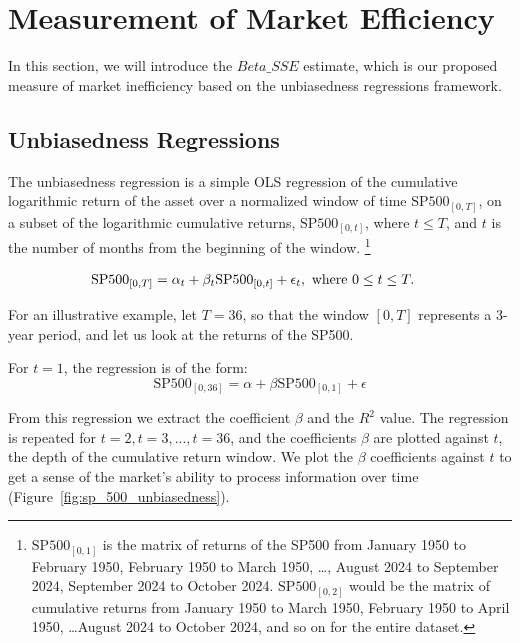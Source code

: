 \section{Measurement of Market Efficiency}
\label{sec:market_efficiency}

In this section, we will introduce the $Beta\_SSE$ estimate, which is our proposed measure of market inefficiency based on the unbiasedness regressions framework.

\subsection{Unbiasedness Regressions}

\noindent The unbiasedness regression is a simple OLS regression of the cumulative logarithmic return of the asset over a normalized window of time $\mathrm{SP500}_{[0, T]}$, on a subset of the
logarithmic cumulative returns, $\mathrm{SP500}_{[0, t]}$, where $t \leq T$, and $t$ is the number of months from the beginning of the window.
 \footnote{$\mathrm{SP500}_{[0, 1]}$ is the matrix of returns of the SP500 from January 1950 to February 1950, February 1950 to March 1950, \dots, August 2024 to September 2024, September 2024 to October 2024.\newline
$\mathrm{SP500}_{[0, 2]}$ would be the matrix of cumulative returns from January 1950 to March 1950, February 1950 to April 1950, \dots August 2024 to October 2024, and so on for the entire dataset.}

\begin{equation}
    \begin{aligned}
        \mathrm{SP500}_{[0, T]} &= \alpha_t + \beta_t \mathrm{SP500}_{[0, t]} + \epsilon_{t}, \hfill \text{   where } 0 \leq t \leq T.
    \end{aligned}
\end{equation}

\noindent For an illustrative example, let $T = 36$, so that the window $[0, T]$ represents a 3-year period, and let us look at the returns of the SP500.

\noindent For $t=1$, the regression is of the form:
\begin{equation}
    \mathrm{SP500}_{[0, 36]} = \alpha + \beta \mathrm{SP500}_{[0, 1]} + \epsilon
\end{equation}

\noindent From this regression we extract the coefficient $\beta$ and the $R^2$ value.
The regression is repeated for $t=2, t=3, ..., t=36$, and the coefficients $\beta$ are plotted against $t$, the depth of the cumulative return window.
We plot the $\beta$ coefficients against $t$ to get a sense of the market's ability to process information over time (Figure~\ref{fig:sp_500_unbiasedness}).


